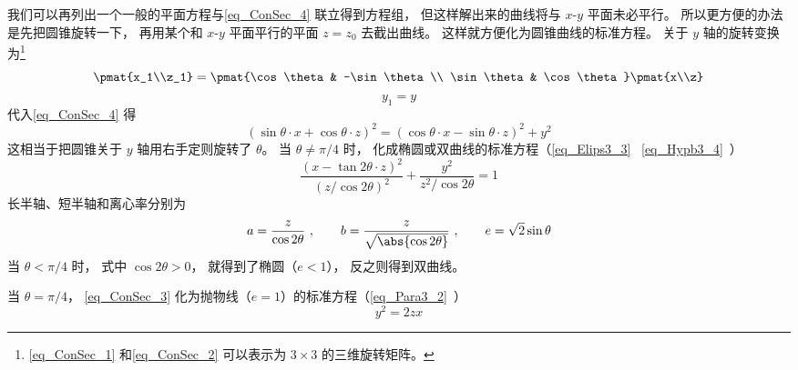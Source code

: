 我们可以再列出一个一般的平面方程与\autoref{eq_ConSec_4} 联立得到方程组， 但这样解出来的曲线将与 $x$-$y$ 平面未必平行。 所以更方便的办法是先把圆锥旋转一下， 再用某个和 $x$-$y$ 平面平行的平面 $z = z_0$ 去截出曲线。 这样就方便化为圆锥曲线的标准方程。 关于 $y$ 轴的旋转变换为\footnote{\autoref{eq_ConSec_1} 和\autoref{eq_ConSec_2} 可以表示为 $3\times 3$ 的三维旋转矩阵。}
\begin{equation}\label{eq_ConSec_1}
\pmat{x_1\\z_1} = \pmat{\cos\theta & -\sin\theta\\ \sin\theta & \cos\theta}\pmat{x\\z}
\end{equation}
\begin{equation}\label{eq_ConSec_2}
y_1 = y
\end{equation}
代入\autoref{eq_ConSec_4} 得
\begin{equation}\label{eq_ConSec_3}
(\sin\theta\cdot x + \cos\theta\cdot z)^2 = (\cos\theta\cdot x - \sin\theta\cdot z)^2 + y^2
\end{equation}
这相当于把圆锥关于 $y$ 轴用右手定则旋转了 $\theta$。 当 $\theta \ne \pi/4$ 时， 化成椭圆或双曲线的标准方程（\autoref{eq_Elips3_3}~ \autoref{eq_Hypb3_4}~）
\begin{equation}
\frac{(x - \tan2\theta \cdot z)^2}{(z/\cos2\theta)^2} + \frac{y^2}{z^2/\cos2\theta} = 1
\end{equation}
长半轴、短半轴和离心率分别为
\begin{equation}
a = \frac{z}{\cos2\theta}~,
\qquad
b = \frac{z}{\sqrt{\abs{\cos2\theta}}}~,
\qquad
e = \sqrt{2}\sin\theta
\end{equation}
当 $\theta < \pi/4$ 时， 式中 $\cos2\theta > 0$， 就得到了椭圆（$e < 1$）， 反之则得到双曲线。

当 $\theta = \pi/4$， \autoref{eq_ConSec_3} 化为抛物线（$e = 1$）的标准方程（\autoref{eq_Para3_2}~）
\begin{equation}
y^2 = 2zx
\end{equation}
